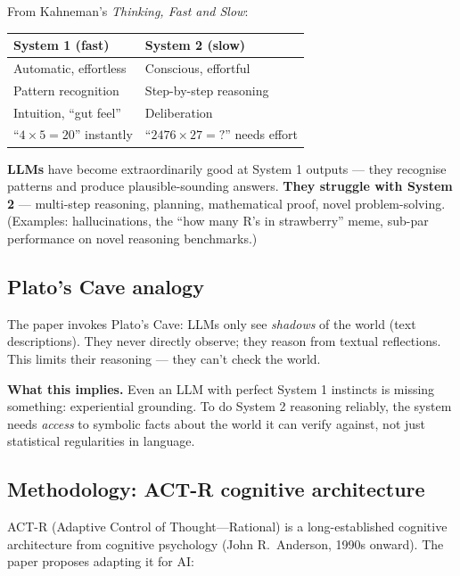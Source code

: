\documentclass[11pt, a4paper]{article}
\newcommand{\thead}[1]{\textbf{#1}}
\begin{document}
From Kahneman's \emph{Thinking, Fast and Slow}:

\begin{center}
\begin{tabular}{@{}p{6cm}p{8cm}@{}}
\toprule
\thead{System 1 (fast)} & \thead{System 2 (slow)} \\
\midrule
Automatic, effortless        & Conscious, effortful \\
Pattern recognition          & Step-by-step reasoning \\
Intuition, ``gut feel''      & Deliberation \\
``$4 \times 5 = 20$'' instantly & ``$2476 \times 27 = ?$'' needs effort \\
\bottomrule
\end{tabular}
\end{center}

\textbf{LLMs} have become extraordinarily good at System 1 outputs — they recognise patterns and produce plausible-sounding answers. \textbf{They struggle with System 2} — multi-step reasoning, planning, mathematical proof, novel problem-solving. (Examples: hallucinations, the ``how many R's in strawberry'' meme, sub-par performance on novel reasoning benchmarks.)

\subsection{Plato's Cave analogy}

The paper invokes Plato's Cave: LLMs only see \emph{shadows} of the world (text descriptions). They never directly observe; they reason from textual reflections. This limits their reasoning — they can't check the world.

\textbf{What this implies.} Even an LLM with perfect System 1 instincts is missing something: experiential grounding. To do System 2 reasoning reliably, the system needs \emph{access} to symbolic facts about the world it can verify against, not just statistical regularities in language.

\subsection{Methodology: ACT-R cognitive architecture}

ACT-R (Adaptive Control of Thought—Rational) is a long-established cognitive architecture from cognitive psychology (John R.\ Anderson, 1990s onward). The paper proposes adapting it for AI:
\end{document}
